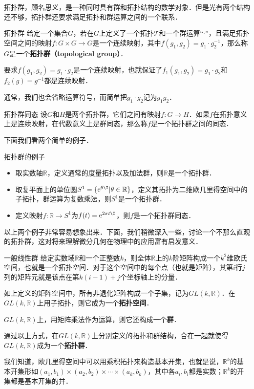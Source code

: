 

拓扑群，顾名思义，是一种同时具有群和拓扑结构的数学对象．但是光有两个结构还不够，拓扑群还要求满足拓扑和群运算之间的一个联系．

\begin{definition}{拓扑群}
给定一个集合$G$，若在$G$上定义了一个拓扑$\mathcal{T}$和一个群运算“$\cdot$”，且满足拓扑空间之间的映射$f:G\times G\rightarrow G$是一个连续映射，其中$f(g_1, g_2)=g_1\cdot g_2^{-1}$，那么称$G$是一个\textbf{拓扑群（topological group）}．
\end{definition}

要求$f(g_1, g_2)=g_1\cdot g_2$是一个连续映射，也就保证了$f_1(g_1, g_2)=g_1\cdot g_2$和$f_2(g)=g^{-1}$都是连续映射．

通常，我们也会省略运算符号，而简单把$g_1\cdot g_2$记为$g_1g_2$．

\begin{definition}{拓扑群同态}
设$G$和$H$是两个拓扑群，它们之间有映射$f:G\rightarrow H$．如果$f$在拓扑意义上是连续映射，在代数意义上是群同态，那么称$f$是一个拓扑群之间的同态．
\end{definition}

下面我们看两个简单的例子．

\begin{example}{拓扑群的例子}
\begin{itemize}
\item 取实数轴$\mathbb{R}$，定义通常的度量拓扑以及加法群，则$\mathbb{R}$是一个拓扑群．
\item 取复平面上的单位圆$S^1=\{\mathrm{e}^{\theta\I}|\theta\in\mathbb{R}\}$，定义其拓扑为二维欧几里得空间中的子拓扑，群运算为复数乘法，则$S^1$是一个拓扑群．
\item 定义映射$f:\mathbb{R}\rightarrow S^1$为$f(t)=\mathrm{e}^{2\pi t\I}$，则$f$是一个拓扑群同态．
\end{itemize}
\end{example}

以上两个例子非常容易想象出来．下面，我们稍微深入一些，讨论一个不那么直观的拓扑群，这对将来理解微分几何在物理中的应用富有启发意义．

\begin{example}{一般线性群}
给定实数域$\mathbb{R}$和一个正整数$k$，则全体$\mathbb{R}$上的$k$阶矩阵构成一个$k^2$维欧氏空间，也就是一个拓扑空间．对于这个空间中的每个点（也就是矩阵），其第$i$行$j$列的矩阵元就是该点在第$k(i-1)+j$个坐标轴上的分量．

如上定义的矩阵空间中，所有非退化矩阵构成一个子集，记为$GL(k, \mathbb{R})$．在$GL(k,\mathbb{R})$上用子拓扑，则它成为一个\textbf{拓扑空间}．

$GL(k,\mathbb{R})$上，用矩阵乘法作为运算，则它还构成一个\textbf{群}．

通过以上方式，在$GL(k, \mathbb{R})$上分别定义的拓扑和群结构，合在一起就使得$GL(k, \mathbb{R})$成为一个\textbf{拓扑群}．
\end{example}

我们知道，欧几里得空间中可以用乘积拓扑来构造基本开集，也就是说，$\mathbb{R}^k$的基本开集形如$(a_1, b_1)\times(a_2, b_2)\times\cdots\times(a_k, b_k)$，其中各$a_i, b_i$都是实数；$\mathbb{R}^k$的开集都是基本开集的并．



